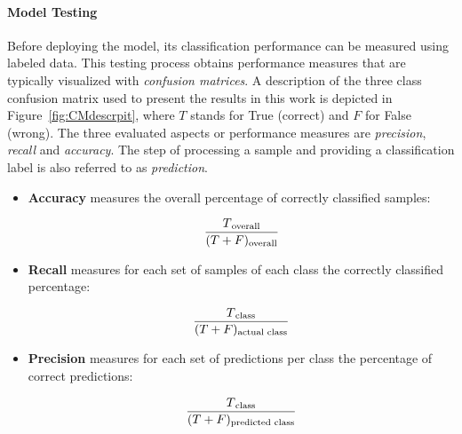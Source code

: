 \paragraph*{Model Testing}
Before deploying the model, its classification performance can be measured using labeled data.
This testing process obtains performance measures that are typically visualized with \emph{confusion matrices}. 
A description of the three class confusion matrix used to present the results in this work is depicted in Figure~\ref{fig:CMdescrpit}, where $T$ stands for True (correct) and $F$ for False (wrong).
The three evaluated aspects or performance measures are \emph{precision}, \emph{recall} and \emph{accuracy}.
The step of processing a sample and providing a classification label is also referred to as \emph{prediction}.

\vspace{50px}

\begin{itemize}
\item \textbf{Accuracy} measures the overall percentage of correctly classified samples: 

    \begin{equation}
        \frac{T\textsubscript{overall}}{(T+F)\textsubscript{overall}} 
    \end{equation}

\item \textbf{Recall} measures for each set of samples of each class the correctly classified percentage:

    \begin{equation}
        \frac{T\textsubscript{class}}{(T+F)\textsubscript{actual class}}
    \end{equation}

\item \textbf{Precision} measures for each set of predictions per class the percentage of correct predictions: 

    \begin{equation}
        \frac{T\textsubscript{class}}{(T+F)\textsubscript{predicted class}}
    \end{equation}
    
\end{itemize}


